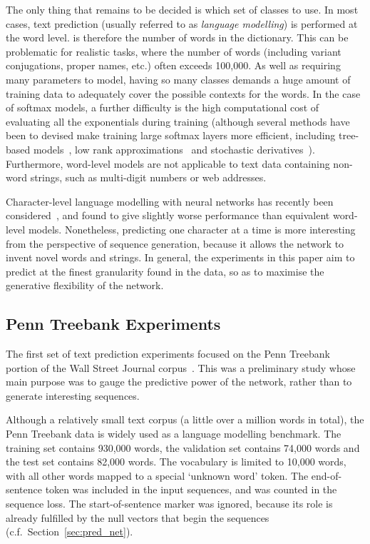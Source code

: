 \documentclass{article}
\newcommand{\cf}{c.f.\ }
\newcommand{\sref}[1]{Section~\ref{sec:#1}}
\begin{document}
The only thing that remains to be decided is which set of classes to use.
In most cases, text prediction (usually referred to as \emph{language modelling}) is performed at the word level.
 is therefore the number of words in the dictionary.
This can be problematic for realistic tasks, where the number of words (including variant conjugations, proper names, etc.) often exceeds 100,000.
As well as requiring many parameters to model, having so many classes demands a huge amount of training data to adequately cover the possible contexts for the words.
In the case of softmax models, a further difficulty is the high computational cost of evaluating all the exponentials during training (although several methods have been to devised make training large softmax layers more efficient, including tree-based models~\cite{mnih08tree,mikolov12thesis}, low rank approximations~\cite{sainath13rank} and stochastic derivatives~\cite{mnih12noise}).
Furthermore, word-level models are not applicable to text data containing non-word strings, such as multi-digit numbers or web addresses. 

Character-level language modelling with neural networks has recently been considered~\cite{sutskever11rnn,mikolov12subword}, and found to give slightly worse performance than equivalent word-level models.
Nonetheless, predicting one character at a time is more interesting from the perspective of sequence generation, because it allows the network to invent novel words and strings.
In general, the experiments in this paper aim to predict at the finest granularity found in the data, so as to maximise the generative flexibility of the network.



\subsection{Penn Treebank Experiments}
The first set of text prediction experiments focused on the Penn Treebank portion of the Wall Street Journal corpus~\cite{penn}.
This was a preliminary study whose main purpose was to gauge the predictive power of the network, rather than to generate interesting sequences.

Although a relatively small text corpus (a little over a million words in total), the Penn Treebank data is widely used as a language modelling benchmark.
The training set contains 930,000 words, the validation set contains 74,000 words and the test set  contains 82,000 words.
The vocabulary is limited to 10,000 words, with all other words mapped to a special `unknown word' token.
The end-of-sentence token was included in the input sequences, and was counted in the sequence loss.
The start-of-sentence marker was ignored, because its role is already fulfilled by the null vectors that begin the sequences (\cf \sref{pred_net}).
\end{document}
